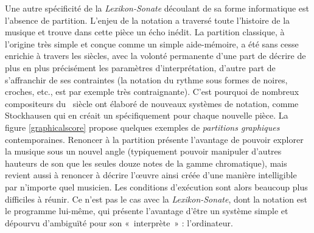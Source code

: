 \documentclass[a4paper,12pt]{article}
\newcommand{\guill}[1]{«~#1~»}
\begin{document}
Une autre spécificité de la \emph{Lexikon-Sonate} découlant de sa forme informatique est l'absence de partition. L'enjeu de la notation a traversé toute l'histoire de la musique et trouve dans cette pièce un écho inédit. La partition classique, à l'origine très simple et conçue comme un simple aide-mémoire, a été sans cesse enrichie à travers les siècles, avec la volonté permanente d'une part de décrire de plus en plus précisément les paramètres d'interprétation, d'autre part de s'affranchir de ses contraintes (la notation du rythme sous formes de noires, croches, etc., est par exemple très contraignante). C'est pourquoi de nombreux compositeurs du \XXe~siècle ont élaboré de nouveaux systèmes de notation, comme Stockhausen qui en créait un spécifiquement pour chaque nouvelle pièce. La figure \ref{graphicalscore} propose quelques exemples de \emph{partitions graphiques} contemporaines.
Renoncer à la partition présente l'avantage de pouvoir explorer la musique sous un nouvel angle (typiquement pouvoir manipuler d'autres hauteurs de son que les seules douze notes de la gamme chromatique), mais revient aussi à renoncer à décrire l'œuvre ainsi créée d'une manière intelligible par n'importe quel musicien. Les conditions d'exécution sont alors beaucoup plus difficiles à réunir. Ce n'est pas le cas avec la \emph{Lexikon-Sonate}, dont la notation est le programme lui-même, qui présente l'avantage d'être un système simple et dépourvu d'ambiguïté pour son \guill{interprète} : l'ordinateur.
\end{document}
